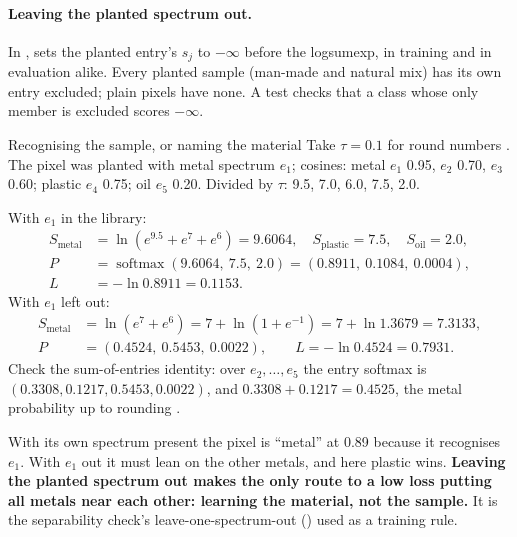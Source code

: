 \paragraph{Leaving the planted spectrum out.} In ,  sets the
planted entry's $s_j$ to $-\infty$ before the logsumexp, in training and in evaluation alike. Every planted sample
(man-made and natural mix) has its own entry excluded; plain pixels have none. A test checks that a class whose only
member is excluded scores $-\infty$.

\begin{worked}[label={we:namer:classscore}]{Recognising the sample, or naming the material}
Take $\tau=0.1$ for round numbers \tagA. The pixel was planted with metal spectrum $e_1$; cosines: metal $e_1$ 0.95,
$e_2$ 0.70, $e_3$ 0.60; plastic $e_4$ 0.75; oil $e_5$ 0.20. Divided by $\tau$: 9.5, 7.0, 6.0, 7.5, 2.0.

With $e_1$ in the library:
\begin{align*}
S_{\text{metal}} &= \ln(e^{9.5}+e^{7}+e^{6}) = 9.6064, \quad S_{\text{plastic}}=7.5, \quad S_{\text{oil}}=2.0,\\
P &= \operatorname{softmax}(9.6064,\ 7.5,\ 2.0) = (0.8911,\ 0.1084,\ 0.0004),\\
L &= -\ln0.8911=0.1153 .
\end{align*}
With $e_1$ left out:
\begin{align*}
S_{\text{metal}} &= \ln(e^{7}+e^{6}) = 7+\ln(1+e^{-1}) = 7+\ln1.3679 = 7.3133,\\
P &= (0.4524,\ 0.5453,\ 0.0022),\qquad L=-\ln0.4524=0.7931 .
\end{align*}
Check the sum-of-entries identity: over $e_2,\dots,e_5$ the entry softmax is $(0.3308,0.1217,0.5453,0.0022)$, and
$0.3308+0.1217=0.4525$, the metal probability up to rounding \tagC.
\end{worked}

With its own spectrum present the pixel is ``metal'' at 0.89 because it recognises $e_1$. With $e_1$ out it must lean
on the other metals, and here plastic wins. \textbf{Leaving the planted spectrum out makes the only route to a low loss
putting all metals near each other: learning the material, not the sample.} It is the separability check's
leave-one-spectrum-out () used as a training rule.

